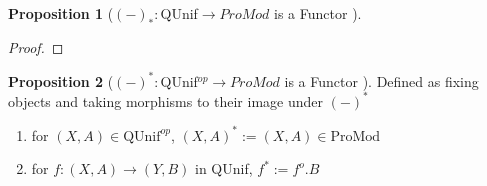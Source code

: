 \documentclass[18pt,a4paper]{article}
\theoremstyle{definition}
\newtheorem{proop}{Proposition}[section]
\begin{document}

	\begin{proop}[$(-)_*:$QUnif$\to ProMod$ is a Functor ]

	\end{proop}
	\begin{proof}

	\end{proof}

	\begin{proop}[$(-)^*:$QUnif$^{op} \to ProMod$ is a Functor ]
		Defined as fixing objects and taking morphisms to their image under $(-)^*$
		\begin{enumerate}[label=(\alph*)]
			\item for $(X,A) \in \text{QUnif}^{op}$, $(X,A)^*:=(X,A) \in \text{ProMod}$
			\item for $f:(X,A) \to (Y,B)$ in QUnif,
				$f^* := f^o .B$
		\end{enumerate}
	\end{proop}
\end{document}
